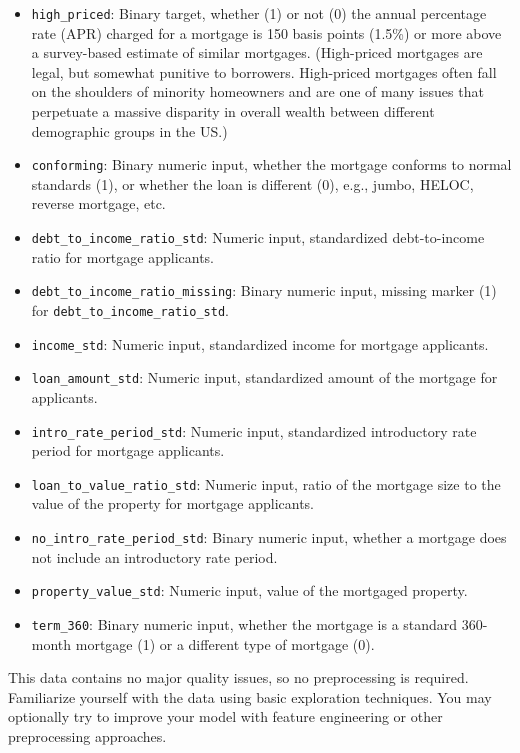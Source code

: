 \documentclass[fleqn]{article}
\begin{document}
\begin{itemize}\small
\item \texttt{high\_priced}: Binary target, whether (1) or not (0) the annual percentage rate (APR) charged for a mortgage is 150 basis points (1.5\%) or more above a survey-based estimate of similar mortgages. (High-priced mortgages are legal, but somewhat punitive to borrowers. High-priced mortgages often fall on the shoulders of minority homeowners and are one of many issues that perpetuate a massive disparity in overall wealth between different demographic groups in the US.)
\item \texttt{conforming}: Binary numeric input, whether the mortgage conforms to normal standards (1), or whether the loan is different (0), e.g., jumbo, HELOC, reverse mortgage, etc.
\item \texttt{debt\_to\_income\_ratio\_std}: Numeric input, standardized debt-to-income ratio for mortgage applicants.
\item \texttt{debt\_to\_income\_ratio\_missing}: Binary numeric input, missing marker (1) for \texttt{debt\_to\_income\_ratio\_std}.
\item \texttt{income\_std}: Numeric input, standardized income for mortgage applicants.
\item \texttt{loan\_amount\_std}: Numeric input, standardized amount of the mortgage for applicants.
\item \texttt{intro\_rate\_period\_std}: Numeric input, standardized introductory rate period for mortgage applicants.
\item \texttt{loan\_to\_value\_ratio\_std}: Numeric input, ratio of the mortgage size to the value of the property for mortgage applicants.
\item \texttt{no\_intro\_rate\_period\_std}: Binary numeric input, whether a mortgage does not include an introductory rate period.
\item \texttt{property\_value\_std}: Numeric input, value of the mortgaged property.
\item \texttt{term\_360}: Binary numeric input, whether the mortgage is a standard 360-month mortgage (1) or a different type of mortgage (0).
\end{itemize}

\noindent This data contains no major quality issues, so no preprocessing is required. Familiarize yourself with the data using basic exploration techniques. You may optionally try to improve your model with feature engineering or other preprocessing approaches.\\
\end{document}

